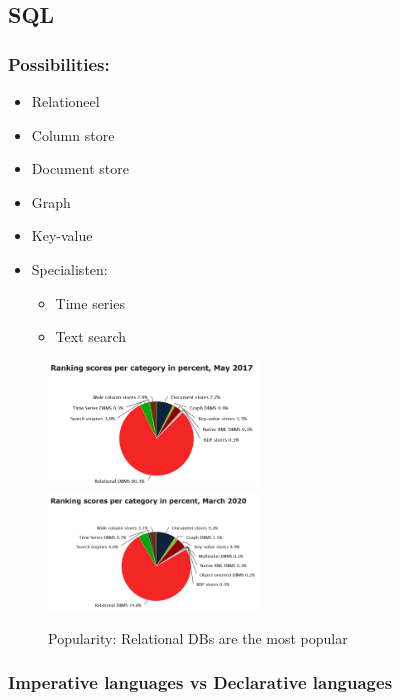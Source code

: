 \documentclass{article}
\begin{document}
\subsection{SQL}

\subsubsection{Possibilities:}

\begin{itemize}
    \item Relationeel
    \item Column store 
    \item Document store
    \item Graph
    \item Key-value
    \item Specialisten:
    \begin{itemize}
        \item Time series
        \item Text search
    \end{itemize}
\end{itemize}

\begin{figure}[H]
    \centering
    \includegraphics[width=0.5\textwidth]{sql-piechart.png}
    \includegraphics[width=0.5\textwidth]{sql-piechart2.png}
    \caption{Popularity: Relational DBs are the most popular}
\end{figure}

\subsubsection{Imperative languages vs Declarative languages}
\end{document}
